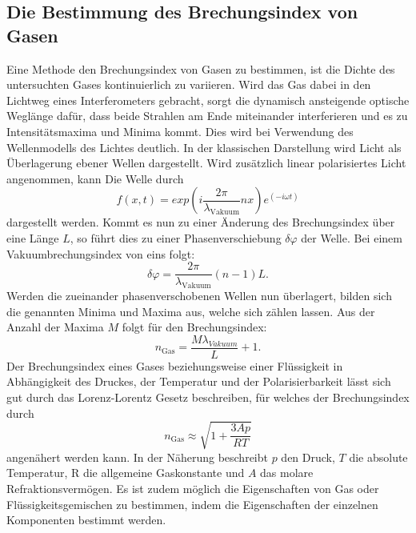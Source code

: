  \subsection{Die Bestimmung des Brechungsindex von Gasen}
 Eine Methode den Brechungsindex von Gasen zu bestimmen, ist die Dichte des untersuchten Gases kontinuierlich zu variieren. Wird das Gas dabei in den Lichtweg eines Interferometers gebracht, sorgt die dynamisch ansteigende optische Weglänge dafür, dass beide Strahlen am Ende miteinander interferieren und es zu Intensitätsmaxima und Minima kommt. Dies wird bei Verwendung des Wellenmodells des Lichtes deutlich. 
 In der klassischen Darstellung wird Licht als Überlagerung ebener Wellen dargestellt. Wird zusätzlich linear polarisiertes Licht angenommen, kann Die Welle durch
 \begin{equation}
    f(x,t) = exp(i \frac{2 \pi}{\lambda_\text{Vakuum}} n x ) e^{(-i \omega t)} \label{eq:ebeneWelle}
 \end{equation}
dargestellt werden. Kommt es nun zu einer Änderung des Brechungsindex über eine Länge $L$, so führt dies zu einer Phasenverschiebung $\delta\varphi$ der Welle. Bei einem Vakuumbrechungsindex von eins folgt:
\begin{equation}
    \delta \varphi = \frac{2 \pi}{\lambda_\text{Vakuum}} (n-1) L \text{.} \label{eq:Deltaphi}
\end{equation}
Werden die zueinander phasenverschobenen Wellen nun überlagert, bilden sich die genannten Minima und Maxima aus, welche sich zählen lassen. Aus der Anzahl der Maxima $M$ folgt für den Brechungsindex:
\begin{equation}
	n_\text{Gas} = \frac{M  \lambda_{Vakuum}}{L} +1 \text{.} \label{eq:nGas}
\end{equation} 
Der Brechungsindex eines Gases beziehungsweise einer Flüssigkeit in Abhängigkeit des Druckes, der Temperatur und der Polarisierbarkeit lässt sich gut durch das Lorenz-Lorentz Gesetz beschreiben, für welches der Brechungsindex durch 
\begin{equation}
n_\text{Gas} \approx \sqrt{1+\frac{3 A p}{R T}} \label{eq:lorenz}
\end{equation}
angenähert werden kann. In der Näherung beschreibt $p$ den Druck, $T$ die absolute Temperatur, R die allgemeine Gaskonstante und $A$ das molare Refraktionsvermögen. Es ist zudem möglich die Eigenschaften von Gas oder Flüssigkeitsgemischen zu bestimmen, indem die Eigenschaften der einzelnen Komponenten bestimmt werden.

